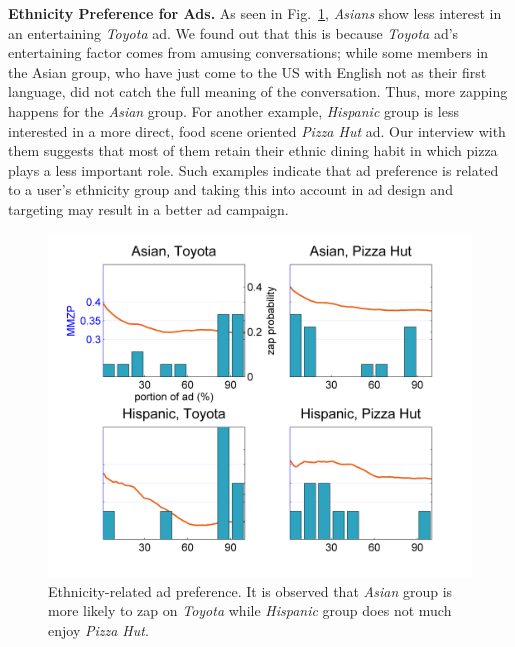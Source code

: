 \documentclass[twoside,leqno,twocolumn]{article}
\begin{document}
\noindent \textbf{Ethnicity Preference for Ads.} As seen in Fig.~\ref{fig:eth_ad}, \textit{Asians} show less interest in an entertaining \textit{Toyota} ad. We found out that this is because \textit{Toyota} ad's entertaining factor comes from amusing conversations; while some members in the Asian group, who have just come to the US with English not as their first language, did not catch the full meaning of the conversation. Thus, more zapping happens for the \textit{Asian} group. For another example, \textit{Hispanic} group is less interested in a more direct, food scene oriented \textit{Pizza Hut} ad. Our interview with them suggests that most of them retain their ethnic dining habit in which pizza plays a less important role. Such examples indicate that ad preference is related to a user's ethnicity group and taking this into account in ad design and targeting may result in a better ad campaign.


\begin{figure}[t]
	\centering
		\includegraphics[width=.9\columnwidth]{fig/eth_ad.png}
	\caption{Ethnicity-related ad preference. It is observed that \textit{Asian} group is more likely to zap on \textit{Toyota} while \textit{Hispanic} group does not much enjoy \textit{Pizza Hut}.}
	\label{fig:eth_ad}
\end{figure}
\end{document}
